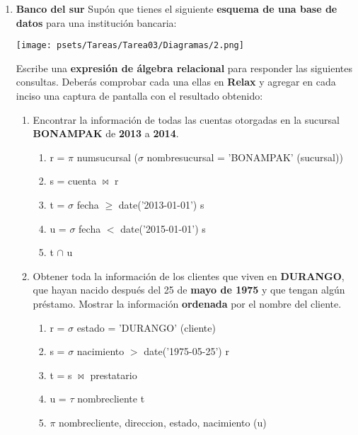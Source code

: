 \documentclass[10pt,letterpaper,fleqn]{article}
\begin{document}
\begin{enumerate}
        \item \textbf{Banco del sur}
        Supón que tienes el siguiente \textbf{esquema de una base de datos} para una institución bancaria:
        \begin{center}
            \texttt{[image: psets/Tareas/Tarea03/Diagramas/2.png]}
        \end{center}
        Escribe una \textbf{expresión de álgebra relacional} para responder las siguientes consultas. Deberás comprobar cada una ellas en \textbf{Relax} y agregar en cada inciso una captura de pantalla con el resultado obtenido:
        \begin{enumerate}[a]
            \item Encontrar la información de todas las cuentas otorgadas en la sucursal \textbf{BONAMPAK} de \textbf{2013} a \textbf{2014}.
            \begin{enumerate}[1]
                \item \textbar \quad r = $\pi$ numsucursal ($\sigma$ nombresucursal = 'BONAMPAK' (sucursal))
                \item \textbar \quad s = cuenta $\bowtie$ r 
                \item \textbar \quad t = $\sigma$ fecha $\geq$ date('2013-01-01') s
                \item \textbar \quad u = $\sigma$ fecha $<$ date('2015-01-01') s 
                \item \textbar \quad t $\cap$ u 
            \end{enumerate}
            \item Obtener toda la información de los clientes que viven en \textbf{DURANGO}, que hayan nacido después del 25 de \textbf{mayo de 1975} y que tengan algún préstamo. Mostrar la información \textbf{ordenada} por el nombre del cliente.
            \begin{enumerate}[1]
                \item \textbar \quad r = $\sigma$ estado = 'DURANGO' (cliente)
                \item \textbar \quad s = $\sigma$ nacimiento $>$ date('1975-05-25') r 
                \item \textbar \quad t = s $\bowtie$ prestatario
                \item \textbar \quad u = $\tau$ nombrecliente t 
                \item \textbar \quad $\pi$ nombrecliente, direccion, estado, nacimiento (u)
            \end{enumerate}

\end{enumerate}
\end{enumerate}
\end{document}
